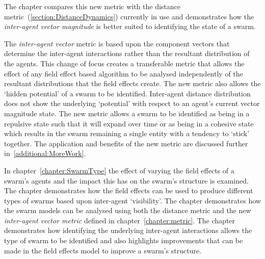 The chapter compares this new metric with the distance metric~(\autoref{section:DistanceDynamics}) currently in use and demonstrates how the \textit{inter-agent vector magnitude} is better suited to identifying the state of a swarm.  


The \textit{inter-agent vector} metric is based upon the component vectors that determine the inter-agent interactions rather than the resultant distribution of the agents. This change of focus creates a transferable metric that allows the effect of any field effect based algorithm to be analysed independently of the resultant distributions that the field effects create. The new metric also allows the `hidden potential' of a swarm to be identified. Inter-agent distance distribution does not show the underlying `potential' with respect to an agent's current vector magnitude state. The new metric allows a swarm to be identified as being in a repulsive state such that it will expand over time or as being in a cohesive state which results in the swarm remaining a single entity with a tendency to `stick' together. The application and benefits of the new metric are discussed further in~\autoref{additional:MoreWork}.

In chapter~\ref{chapter:SwarmType} the effect of varying the field effects of a swarm's agents and the impact this has on the swarm's structure is examined. The chapter demonstrates how the field effects can be used to produce different types of swarms based upon inter-agent `visibility'. The chapter demonstrates how the swarm models can be analysed using both the distance metric and the new \textit{inter-agent vector metric} defined in chapter~\ref{chapter:metric}. The chapter demonstrates how identifying the underlying inter-agent interactions allows the type of swarm to be identified and also highlights improvements that can be made in the field effects model to improve a swarm's structure. 

